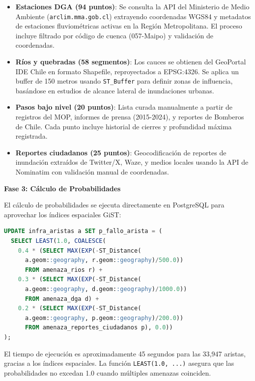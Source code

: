 \documentclass[conference]{IEEEtran}
\begin{document}
\begin{itemize}
    \item \textbf{Estaciones DGA (94 puntos)}: Se consulta la API del Ministerio de Medio Ambiente (\texttt{arclim.mma.gob.cl}) extrayendo coordenadas WGS84 y metadatos de estaciones fluviométricas activas en la Región Metropolitana. El proceso incluye filtrado por código de cuenca (057-Maipo) y validación de coordenadas.

    \item \textbf{Ríos y quebradas (58 segmentos)}: Los cauces se obtienen del GeoPortal IDE Chile en formato Shapefile, reproyectados a EPSG:4326. Se aplica un buffer de 150 metros usando \texttt{ST\_Buffer} para definir zonas de influencia, basándose en estudios de alcance lateral de inundaciones urbanas.

    \item \textbf{Pasos bajo nivel (20 puntos)}: Lista curada manualmente a partir de registros del MOP, informes de prensa (2015-2024), y reportes de Bomberos de Chile. Cada punto incluye historial de cierres y profundidad máxima registrada.

    \item \textbf{Reportes ciudadanos (25 puntos)}: Geocodificación de reportes de inundación extraídos de Twitter/X, Waze, y medios locales usando la API de Nominatim con validación manual de coordenadas.
\end{itemize}

\textbf{Fase 3: Cálculo de Probabilidades}

El cálculo de probabilidades se ejecuta directamente en PostgreSQL para aprovechar los índices espaciales GiST:

\begin{lstlisting}[language=SQL, basicstyle=\tiny\ttfamily]
UPDATE infra_aristas a SET p_fallo_arista = (
  SELECT LEAST(1.0, COALESCE(
    0.4 * (SELECT MAX(EXP(-ST_Distance(
      a.geom::geography, r.geom::geography)/500.0))
      FROM amenaza_rios r) +
    0.3 * (SELECT MAX(EXP(-ST_Distance(
      a.geom::geography, d.geom::geography)/1000.0))
      FROM amenaza_dga d) +
    0.2 * (SELECT MAX(EXP(-ST_Distance(
      a.geom::geography, p.geom::geography)/200.0))
      FROM amenaza_reportes_ciudadanos p), 0.0))
);
\end{lstlisting}

El tiempo de ejecución es aproximadamente 45 segundos para las 33,947 aristas, gracias a los índices espaciales. La función \texttt{LEAST(1.0, ...)} asegura que las probabilidades no excedan 1.0 cuando múltiples amenazas coinciden.
\end{document}

